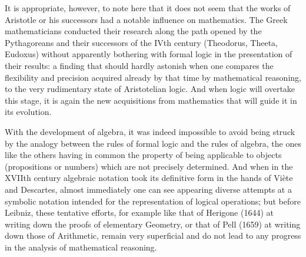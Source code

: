 It is appropriate, however, to note here that it does not seem that the works of Aristotle or his successors had a notable influence on mathematics. The Greek mathematicians conducted their research along the path opened by the Pythagoreans and their successors of the IVth century (Theodorus, Theeta, Eudoxus) without apparently bothering with formal logic in the presentation of their results: a finding that should hardly astonish when one compares the flexibility and precision acquired already by that time by mathematical reasoning, to the very rudimentary state of Aristotelian logic. And when logic will overtake this stage, it is again the new acquisitions from mathematics that will guide it in its evolution.

With the development of algebra, it was indeed impossible to avoid being struck by the analogy between the rules of formal logic and the rules of algebra, the ones like the others having in common the property of being applicable to objects (propositions or numbers) which are not precisely determined. And when in the XVIIth century algebraic notation took its definitive form in the hands of Viète and Descartes, almost immediately one can see appearing diverse attempts at a symbolic notation intended for the representation of logical operations; but before Leibniz, these tentative efforts, for example like that of Herigone (1644) at writing down the proofs of elementary Geometry, or that of Pell (1659) at writing down those of Arithmetic, remain very superficial and do not lead to any progress in the analysis of mathematical reasoning.

